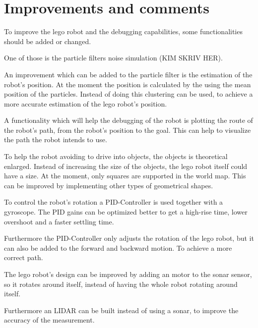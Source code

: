 \section{Improvements and comments}

To improve the lego robot and the debugging capabilities, some functionalities should be added or changed.

One of those is the particle filters noise simulation (KIM SKRIV HER).

An improvement which can be added to the particle filter is the estimation of the robot's position. At the moment the position is calculated by the using the mean position of the particles. Instead of doing this clustering can be used, to achieve a more accurate estimation of the lego robot's position.

A functionality which will help the debugging of the robot is plotting the route of the robot’s path, from the robot’s position to the goal. This can help to visualize the path the robot intends to use.

To help the robot avoiding to drive into objects, the objects is theoretical enlarged. Instead of increasing the size of the objects, the lego robot itself could have a size.
At the moment, only squares are supported in the world map. This can be improved by implementing other types of geometrical shapes.

To control the robot’s rotation a PID-Controller is used together with a gyroscope. The PID gains can be optimized better to get a high-rise time, lower overshoot and a faster settling time.

Furthermore the PID-Controller only adjusts the rotation of the lego robot, but it can also be added to the forward and backward motion. To achieve a more correct path.

The lego robot’s design can be improved by adding an motor to the sonar sensor, so it rotates around itself, instead of having the whole robot rotating around itself. 

Furthermore an LIDAR can be built instead of using a sonar, to improve the accuracy of the measurement.